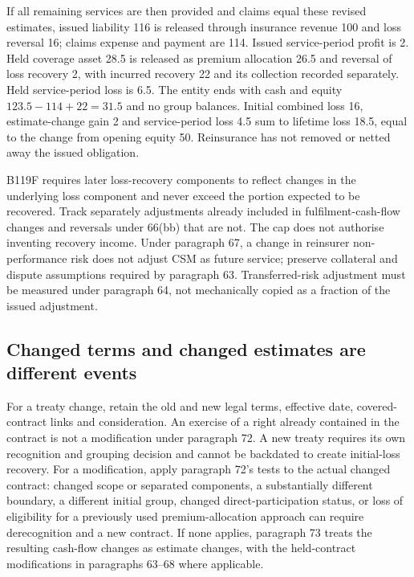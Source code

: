If all remaining services are then provided and claims equal these revised estimates, issued liability 116 is released through insurance revenue 100 and loss reversal 16; claims expense and payment are 114. Issued service-period profit is 2. Held coverage asset 28.5 is released as premium allocation 26.5 and reversal of loss recovery 2, with incurred recovery 22 and its collection recorded separately. Held service-period loss is 6.5. The entity ends with cash and equity \(123.5-114+22=31.5\) and no group balances. Initial combined loss 16, estimate-change gain 2 and service-period loss 4.5 sum to lifetime loss 18.5, equal to the change from opening equity 50. Reinsurance has not removed or netted away the issued obligation.

B119F requires later loss-recovery components to reflect changes in the underlying loss component and never exceed the portion expected to be recovered. Track separately adjustments already included in fulfilment-cash-flow changes and reversals under 66(bb) that are not. The cap does not authorise inventing recovery income. Under paragraph 67, a change in reinsurer non-performance risk does not adjust CSM as future service; preserve collateral and dispute assumptions required by paragraph 63. Transferred-risk adjustment must be measured under paragraph 64, not mechanically copied as a fraction of the issued adjustment.

\hypertarget{changed-terms-and-changed-estimates-are-different-events}{%
\subsection{Changed terms and changed estimates are different events}\label{changed-terms-and-changed-estimates-are-different-events}}

For a treaty change, retain the old and new legal terms, effective date, covered-contract links and consideration. An exercise of a right already contained in the contract is not a modification under paragraph 72. A new treaty requires its own recognition and grouping decision and cannot be backdated to create initial-loss recovery. For a modification, apply paragraph 72's tests \citep[IFRS~17.72--77]{eu20231803} to the actual changed contract: changed scope or separated components, a substantially different boundary, a different initial group, changed direct-participation status, or loss of eligibility for a previously used premium-allocation approach can require derecognition and a new contract. If none applies, paragraph 73 treats the resulting cash-flow changes as estimate changes, with the held-contract modifications in paragraphs 63--68 where applicable.

